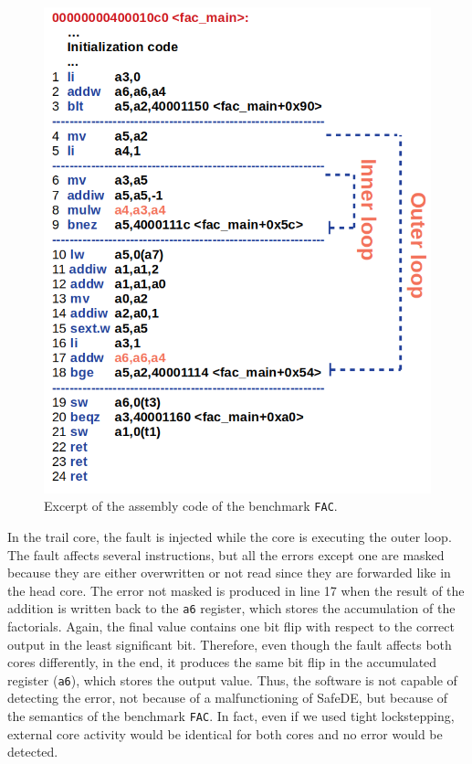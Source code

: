 \begin{figure}[t!]
\centering
  \includegraphics[width=0.85\columnwidth]{imgs/fac_assembly.png} 
  \caption{Excerpt of the assembly code of the benchmark \texttt{FAC}.}
  \label{fig:fac_dump}
\end{figure}


In the trail core, the fault is injected while the core is executing the outer loop. The fault affects several instructions, but all the errors except one are masked because they are either overwritten or not read since they are forwarded like in the head core. The error not masked is produced in line 17 when the result of the addition is written back to the \texttt{a6} register, which stores the accumulation of the factorials. Again, the final value contains one bit flip with respect to the correct output in the least significant bit. 
Therefore, even though the fault affects both cores differently, in the end, it produces the same bit flip in the accumulated register (\texttt{a6}), which stores the output value. Thus, the software is not capable of detecting the error, not because of a malfunctioning of SafeDE, but because of the semantics of the benchmark \texttt{FAC}. 
In fact, even if we used tight lockstepping, external core activity would be identical for both cores and no error would be detected.

